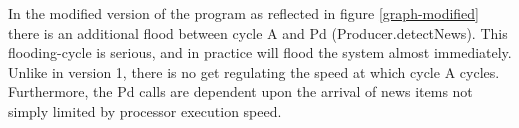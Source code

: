 \documentclass[12pt]{article}%
\begin{document}
In the modified version of the program as reflected in figure \ref{graph-modified} there is an additional flood between cycle A and
Pd (Producer.detectNews). This flooding-cycle is serious, and in practice will flood the system almost immediately.
Unlike in version 1, there is no get regulating the speed at which cycle A cycles. Furthermore, the Pd calls are dependent upon the
arrival of news items not simply limited by processor execution speed.



% 

%
\end{document}
